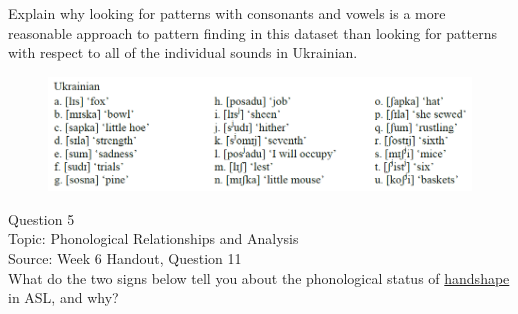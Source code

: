 \documentclass[12pt]{article}
\begin{document}
Explain why looking for patterns with consonants and vowels is a more reasonable approach to pattern finding in this dataset than looking for patterns with respect to all of the individual sounds in Ukrainian.\\

\begin{figure}[H]
\includegraphics{../images/ukrainian.png}
\end{figure}

\newpage

{\large Question 5}\\

Topic: Phonological Relationships and Analysis\\
Source: Week 6 Handout, Question 11\\

What do the two signs below tell you about the phonological status of \underline{handshape} in ASL, and why?\\
\end{document}
